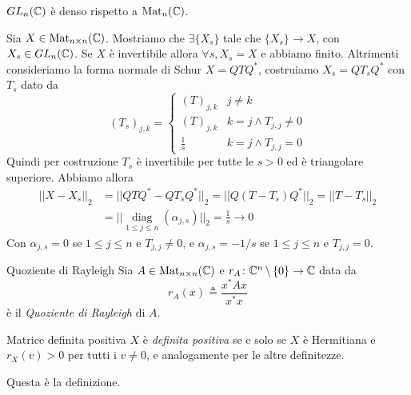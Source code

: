 \documentclass[a4paper]{article}
\begin{document}
\begin{snippettheorem}{}
    \(GL_n(\mathbb{C})\) è denso rispetto a \(\operatorname{Mat}_n(\mathbb{C})\).
\end{snippettheorem}

\begin{snippetproof}{}
    Sia \(X\in \operatorname{Mat}_{n\times n}(\mathbb{C})\).
    Mostriamo che \(\exists \{X_s\}\) tale che \(\{X_s\} \to X\),
    con \(X_s \in GL_n(\mathbb{C})\).
    Se \(X\) è invertibile allora \(\forall s, X_s = X\) e abbiamo finito.
    Altrimenti consideriamo la forma normale di Schur \(X = QTQ^*\), costruiamo \(X_s = QT_sQ^*\) con \(T_s\) dato da
    \[
        (T_s)_{j,k} =
        \begin{cases}
            (T)_{j,k} & j \neq k \\
            (T)_{j,k} & k=j \land T_{j,j} \neq 0 \\
            \frac{1}{s} & k=j \land T_{j,j} = 0
        \end{cases}
    \]
    Quindi per costruzione \(T_s\) è invertibile per tutte le \(s>0\) ed è triangolare superiore.
    Abbiamo allora
    \begin{align*}
        ||X-X_s||_2 &= ||QTQ^* - QT_sQ^*||_2
        = ||Q(T-T_s)Q^*||_2 = ||T-T_s||_2  \\
        &= ||\underset{1 \leq j \leq n}{\operatorname{diag}}(\alpha_{j,s})||_2 = \frac{1}{s} \to 0
    \end{align*}
    Con \(\alpha_{j,s} = 0\) se \(1 \leq j \leq n\) e \(T_{j,j} \neq 0\),
    e \(\alpha_{j,s} = -1/s\) se \(1 \leq j \leq n\) e \(T_{j,j} = 0\).
\end{snippetproof}

\begin{snippetdefinition}{Quoziente di Rayleigh}
    Sia \(A \in \operatorname{Mat}_{n\times n}(\mathbb{C})\)
    e \(r_A \colon \mathbb{C}^n \,\backslash\, \{0\} \to \mathbb{C}\)
    data da
    \[
        r_A(x) \triangleq \frac{x^*Ax}{x^*x}
    \]
    è il \emph{Quoziente di Rayleigh} di \(A\).
\end{snippetdefinition}

\begin{snippetdefinition}{Matrice definita positiva}
    \(X\) è \emph{definita positiva} se e solo se \(X\) è Hermitiana e \(r_X(v) > 0\)
    per tutti i \(v\neq 0\), e analogamente per le altre definitezze.
\end{snippetdefinition}

Questa è la definizione.
\end{document}
